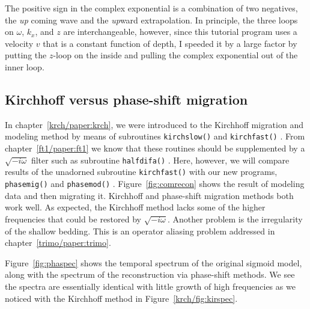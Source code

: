 \par
The positive sign in the complex exponential is a combination of two negatives,
the {\em  up}
coming wave and the {\em  up}ward extrapolation.
In principle,
the three loops on  $\omega$, $k_x$, and  $z$  are interchangeable,
however, since this tutorial program uses
a velocity $v$ that is a constant function of depth,
I speeded it by a large factor by putting the $z$-loop on the inside
and pulling the complex exponential out of the inner loop.

\subsection{Kirchhoff versus phase-shift migration}
In chapter~\ref{krch/paper:krch}, we were introduced to the Kirchhoff
migration and modeling method by means of subroutines
\texttt{kirchslow()}  and \texttt{kirchfast()} .
From chapter~\ref{ft1/paper:ft1} we know that these routines should be
supplemented by a $\sqrt{-i\omega}$
filter such as subroutine \texttt{halfdifa()} .
Here, however,
we will compare results of the unadorned subroutine \texttt{kirchfast()} 
with our new programs, \texttt{phasemig()}  and \texttt{phasemod()} .
Figure~\ref{fig:comrecon} shows the result of modeling data and then migrating it.
Kirchhoff and phase-shift migration methods both work well.
As expected, the Kirchhoff method lacks some of the higher frequencies
that could be restored by $\sqrt{-i\omega}$.
Another problem is the irregularity of the shallow bedding.
This is an operator aliasing problem
addressed in chapter~\ref{trimo/paper:trimo}.


Figure~\ref{fig:phaspec} shows the temporal spectrum of the original sigmoid model,
along with the spectrum of the reconstruction via phase-shift methods.
We see the spectra are essentially identical
with little growth of high frequencies
as we noticed with the Kirchhoff method
in Figure~\ref{krch/fig:kirspec}.


